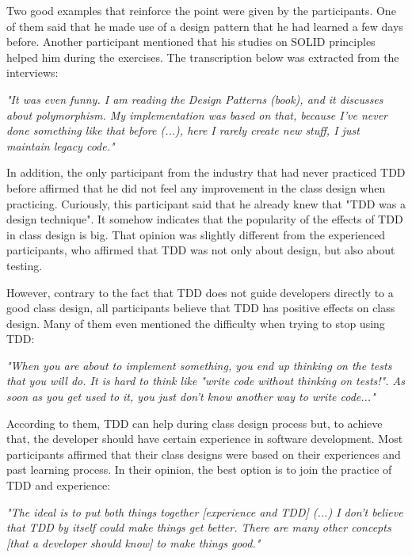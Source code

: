 \documentclass[times]{speauth}
\begin{document}
Two good examples that reinforce the point were given by the participants. One of them
said that he made use of a design pattern \cite{gof} that he had learned a few days before. Another
participant mentioned that his studies on SOLID principles helped him during the exercises.
The transcription below was extracted from the interviews:

\begin{framed}
	\textit{"It was even funny. I am reading the Design Patterns (book), and it discusses about polymorphism. 
	My implementation was based on that, because I've never done something like that before (...), here I rarely
	create new stuff, I just maintain legacy code."}
\end{framed}

In addition, the only participant from the industry that had never practiced TDD before
affirmed that he did not feel any improvement in the class design when practicing.
Curiously, this participant said that he already knew that "TDD was a design technique".
It somehow indicates that the popularity of the effects of TDD in class design
is big.
That opinion was slightly different from the experienced participants, 
who affirmed that TDD was not only about design, but also about testing.

However, contrary to the fact that TDD does not guide developers directly to a
good class design, all participants believe that TDD has positive effects on class design.
Many of them even mentioned the difficulty when trying to stop using TDD:

\begin{framed}

	\textit{"When you are about to implement something, you end up thinking on the tests that you will do. 
	It is hard to think like "write code without thinking on tests!". As soon as you get used to it, 
	you just don't know another way to write code..."}
	
\end{framed}

According to them, TDD can help during class design process but, to achieve that,
the developer should have certain experience in software development. Most participants
affirmed that their class designs were based on their experiences and past learning process.
In their opinion, the best option is to join the practice of TDD and experience:

\begin{framed}

	\textit{"The ideal is to put both things together [experience and TDD] (...) 
	I don't believe that TDD by itself could make things get better. There are many other
	concepts [that a developer should know] to make things good."}

\end{framed}
\end{document}
